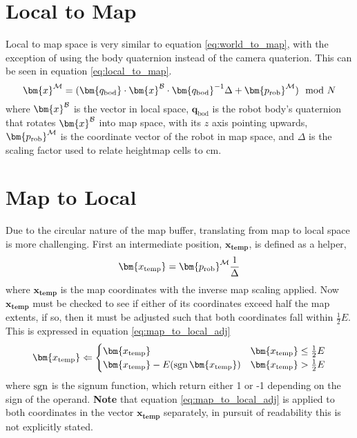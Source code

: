     \section{Local to Map}
        Local to map space is very similar to equation \ref{eq:world_to_map}, with the exception of using the body quaternion instead of the camera quaterion. This can be seen in
        equation \ref{eq:local_to_map}.
        \begin{equation} \label{eq:local_to_map}
            \bm{x}\inrefframe{\fmap} = (\bm{q_\text{bod}} \cdot \bm{x}\inrefframe{\fbody} \cdot \bm{q_\text{bod}}^{-1}\Delta + \bm{p_\text{rob}}\inrefframe{\fmap}) \mod N
        \end{equation}
        where \(\bm{x}\inrefframe{\fbody}\) is the vector in local space, \(\bm{q}_\text{bod}\) is the robot body's quaternion that rotates \(\bm{x}\inrefframe{\fbody}\) into map space, with its \(z\) axis pointing upwards, \(\bm{p_\text{rob}}\inrefframe{\fmap}\) is the coordinate vector of the robot in map space, and \(\Delta\) is the scaling factor
        used to relate heightmap cells to cm.

    \section{Map to Local}
        Due to the circular nature of the map buffer, translating from map to local space is more challenging. First an intermediate position, \(\bm{x_\text{temp}}\), is defined as a helper,
        \begin{equation} \label{eq:map_to_local_help}
            \bm{x_\text{temp}} = \bm{p_\text{rob}}\inrefframe{\fmap}\frac{1}{\Delta}
        \end{equation}
        where \(\bm{x_\text{temp}}\) is the map coordinates with the inverse map scaling applied. Now \(\bm{x_\text{temp}}\) must be checked to see if either of its 
        coordinates exceed half the map extents, if so, then it must be adjusted such that both coordinates fall within \(\frac{1}{2}E\).
        This is expressed in equation \ref{eq:map_to_local_adj}
        \begin{equation} \label{eq:map_to_local_adj}
            \bm{x_\text{temp}} \Leftarrow 
            \begin{cases}
                \bm{x_\text{temp}} & \bm{x_\text{temp}} \leq \frac{1}{2}E \\
                \bm{x_\text{temp}} - E(\sgn \bm{x_\text{temp}}) & \bm{x_\text{temp}} > \frac{1}{2}E
            \end{cases}
        \end{equation}
        where \(\operatorname{sgn}\) is the signum function, which return either 1 or -1 depending on the sign of the operand. 
        \textbf{Note} that equation \ref{eq:map_to_local_adj} is applied to both coordinates in the vector \(\bm{x_\text{temp}}\) separately, in pursuit of readability this is not explicitly stated.

